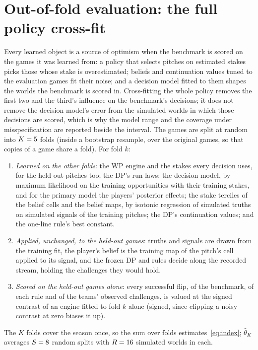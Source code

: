 \documentclass[aoas]{imsart}
\theoremstyle{plain}
\theoremstyle{definition}
\begin{document}
\section{Out-of-fold evaluation: the full policy cross-fit}\label{sec:honest}

Every learned object is a source of optimism when the benchmark is scored on the games it was learned from: a policy
that selects pitches on estimated stakes picks those whose stake is overestimated; beliefs and continuation values tuned
to the evaluation games fit their noise; and a decision model fitted to them shapes the worlds the benchmark is scored
in. Cross-fitting the whole policy removes the first two and the third's influence on the benchmark's decisions; it does
not remove the decision model's error from the simulated worlds in which those decisions are scored, which is why the
model range and the coverage under misspecification are reported beside the interval. The games are split at random into $K=5$ folds (inside a
bootstrap resample, over the original games, so that copies of a game share a fold). For fold $k$:
\begin{enumerate}
\item \emph{Learned on the other folds}: the WP engine and the stakes every decision uses, for the held-out pitches
too; the DP's run laws; the decision model, by maximum likelihood on the training opportunities with their training
stakes, and for the primary model the players' posterior effects; the stake terciles of the belief cells and the belief
maps, by isotonic regression of simulated truths on simulated signals of the training pitches; the DP's continuation
values; and the one-line rule's best constant.
\item \emph{Applied, unchanged, to the held-out games}: truths and signals are drawn from the training fit, the
player's belief is the training map of the pitch's cell applied to its signal, and the frozen DP and rules decide along
the recorded stream, holding the challenges they would hold.
\item \emph{Scored on the held-out games alone}: every successful flip, of the benchmark, of each rule and of the
teams' observed challenges, is valued at the signed contrast of an engine fitted to fold $k$ alone (signed, since
clipping a noisy contrast at zero biases it up).
\end{enumerate}
The $K$ folds cover the season once, so the sum over folds estimates~\eqref{eq:index}; $\hat\theta_K$ averages $S=8$
random splits with $R=16$ simulated worlds in each.
\end{document}
